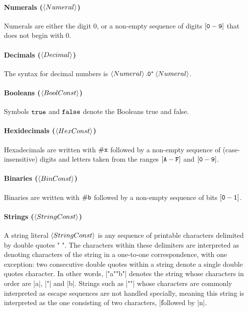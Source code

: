 \documentclass[english,a4paper,10pt]{article}
\begin{document}
\paragraph{Numerals ($\left\langle Numeral\right\rangle$)}
Numerals are
either the digit $0$,
or a non-empty sequence of digits $\left[{\tt 0}-{\tt 9}\right]$
that does not begin with $0$.

\paragraph{Decimals ($\left\langle Decimal\right\rangle$)}
The syntax for decimal numbers is $\left\langle Numeral\right\rangle{\tt .0^{*}}\left\langle Numeral\right\rangle$.

\paragraph{Booleans ($\left\langle BoolConst\right\rangle$)}
Symbols $\texttt{true}$ and $\texttt{false}$ denote the Booleans true and false.

\paragraph{Hexidecimals ($\left\langle HexConst\right\rangle$)}
Hexadecimals are written with ${\tt \#x}$
followed by a non-empty sequence of (case-insensitive) 
digits and letters taken from the ranges $\left[{\tt A}-{\tt F}\right]$
and $\left[{\tt 0}-{\tt 9}\right]$.

\paragraph{Binaries ($\left\langle BinConst\right\rangle$)}
Binaries are written with ${\tt \#b}$
followed by a non-empty sequence of bits $\left[{\tt 0}-{\tt 1}\right]$.

\paragraph{Strings ($\left\langle StringConst\right\rangle$)}
A string literal $\left\langle StringConst\right\rangle$
is any sequence of printable characters
delimited by double quotes $\texttt{"}$ $\texttt{"}$.
The characters within these delimiters
are interpreted as denoting characters of the string in a one-to-one correspondence,
with one exception:
two consecutive double quotes within a string
denote a single double quotes character.
In other words, \code|"a""b"| denotes the string
whose characters in order are \code|a|, \code|"| and \code|b|.
Strings such as \code|"\n"| whose characters are commonly
interpreted as escape sequences are not handled specially,
meaning this string is interpreted 
as the one consisting of two characters, \code|\| followed by \code|n|.
\end{document}
